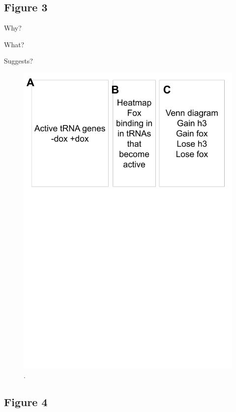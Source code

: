 \documentclass[
  12pt,
]{article}
\begin{document}
\hypertarget{figure-3}{%
\subsection{Figure 3}\label{figure-3}}

Why?

What?

Suggests?

\begin{figure}[H]

{\centering \includegraphics[width=1\linewidth]{../images/results-03} 

}

\caption{.}\label{fig:results-3}
\end{figure}

\hypertarget{figure-4}{%
\subsection{Figure 4}\label{figure-4}}
\end{document}
